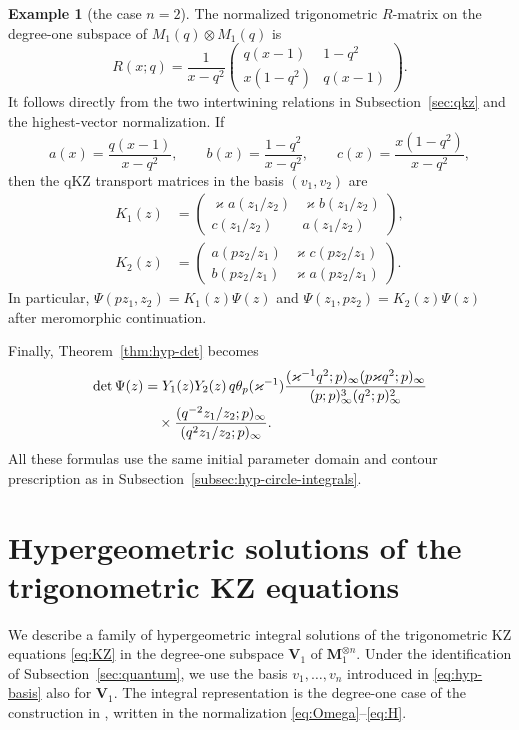\documentclass[12pt]{amsart}
\theoremstyle{definition}
\numberwithin{equation}{section}
\theoremstyle{definition}
\newtheorem*{example}{Example}
\let\tht\theta
\let\ox\otimes
\def\beq{\begin{equation}}
\def\eeq{\end{equation}}
\begin{document}
\begin{example}[the case $n=2$]
The normalized trigonometric $R$-matrix on the degree-one subspace
of $M_1(q)\ox M_1(q)$ is
\beq\label{eq:n2-qkz-R}
 R(x;q)=\frac{1}{x-q^2}
 \begin{pmatrix}
 q(x-1)&1-q^2\\
 x(1-q^2)&q(x-1)
 \end{pmatrix}.
\eeq
It follows directly from the two intertwining relations
in Subsection~\ref{sec:qkz} and the highest-vector normalization.  If
\[
 a(x)=\frac{q(x-1)}{x-q^2},\qquad
 b(x)=\frac{1-q^2}{x-q^2},\qquad
 c(x)=\frac{x(1-q^2)}{x-q^2},
\]
then the qKZ transport matrices in the basis $(v_1,v_2)$ are
\beq\label{eq:n2-qkz-K}
 \begin{aligned}
 K_1(z)&=\begin{pmatrix}
 \varkappa a(z_1/z_2)&\varkappa b(z_1/z_2)\\
 c(z_1/z_2)&a(z_1/z_2)
 \end{pmatrix},\\[6pt]
 K_2(z)&=\begin{pmatrix}
 a(pz_2/z_1)&\varkappa c(pz_2/z_1)\\
 b(pz_2/z_1)&\varkappa a(pz_2/z_1)
 \end{pmatrix}.
 \end{aligned}
\eeq
In particular,
$\Psi(pz_1,z_2)=K_1(z)\Psi(z)$ and
$\Psi(z_1,pz_2)=K_2(z)\Psi(z)$ after meromorphic continuation.

Finally, Theorem~\ref{thm:hyp-det} becomes
\begin{align}
 \det\Psi(z)
 &=Y_1(z)Y_2(z)\,q\tht_p(\varkappa^{-1})
 \frac{(\varkappa^{-1}q^2;p)_\infty
 (p\varkappa q^2;p)_\infty}
 {(p;p)_\infty^3(q^2;p)_\infty^2}
 \notag\\[-2pt]
 &\quad\times
 \frac{(q^{-2}z_1/z_2;p)_\infty}
 {(q^2z_1/z_2;p)_\infty}.
 \label{eq:n2-qkz-det}
\end{align}
All these formulas use the same initial parameter domain and
contour prescription as in Subsection~\ref{subsec:hyp-circle-integrals}.
\end{example}


\section{Hypergeometric solutions of the trigonometric KZ equations}
\label{sec:hyper-kz}

We describe a family of hypergeometric integral solutions of the
trigonometric KZ equations \eqref{eq:KZ} in the degree-one subspace
$\mathbf V_1$ of $\mathbf M_1^{\ox n}$.  Under the identification
of Subsection~\ref{sec:quantum}, we use the basis $v_1,\ldots,v_n$
introduced in \eqref{eq:hyp-basis} also for $\mathbf V_1$.
The integral representation is the degree-one case of the construction
in \cite[Sections~2.2 and~4]{MaV02}, written in the normalization
\eqref{eq:Omega}--\eqref{eq:H}.
\end{document}
